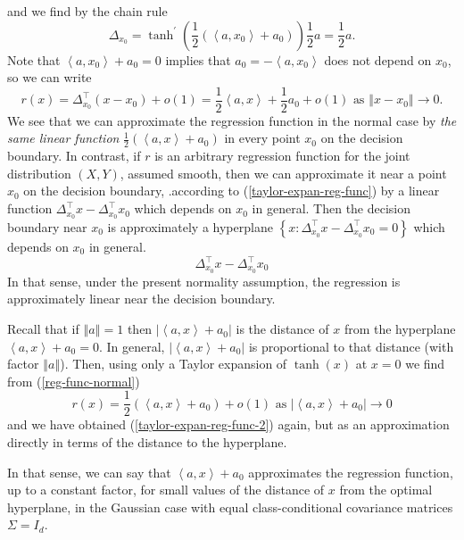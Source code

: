 \documentclass[11pt,twoside]{article}%
\theoremstyle{change}
\begin{document}
and we find by the chain rule
\[
\Delta_{x_{0}}=\tanh^{\prime}(\frac{1}{2}\left(  \left\langle a,x_{0}%
\right\rangle +a_{0}\right)  )\frac{1}{2}a=\frac{1}{2}a.
\]
Note that $\left\langle a,x_{0}\right\rangle +a_{0}=0$ implies that
$a_{0}=-\left\langle a,x_{0}\right\rangle $ does not depend on $x_{0}$, so we
can write
\begin{equation}
r(x)=\Delta_{x_{0}}^{\top}\left(  x-x_{0}\right)  +o(1)=\frac{1}%
{2}\left\langle a,x\right\rangle +\frac{1}{2}a_{0}+o(1)\text{ as }\left\Vert
x-x_{0}\right\Vert \rightarrow0.\label{taylor-expan-reg-func-2}%
\end{equation}
We see that we can approximate the regression function in the normal case by
\textit{the same linear function} $\frac{1}{2}\left(  \left\langle
a,x\right\rangle +a_{0}\right)  $ in every point $x_{0}$ on the decision
boundary. In contrast, if $r$ is an arbitrary regression function for the
joint distribution $(X,Y)$, assumed smooth, then we can approximate it near a
point $x_{0}$ on the decision boundary, .according to
(\ref{taylor-expan-reg-func}) by a linear function $\Delta_{x_{0}}^{\top
}x-\Delta_{x_{0}}^{\top}x_{0}$ which depends on $x_{0}$ in general. Then the
decision boundary near $x_{0}$ is approximately a hyperplane $\left\{
x:\Delta_{x_{0}}^{\top}x-\Delta_{x_{0}}^{\top}x_{0}=0\right\}  $ which depends
on $x_{0}$ in general.
\[
\Delta_{x_{0}}^{\top}x-\Delta_{x_{0}}^{\top}x_{0}%
\]
In that sense, under the present normality assumption, the regression is
approximately linear near the decision boundary.

Recall that if $\left\Vert a\right\Vert =1$ then $\left\vert \left\langle
a,x\right\rangle +a_{0}\right\vert $ is the distance of $x$ from the
hyperplane $\left\langle a,x\right\rangle +a_{0}=0$. In general, $\left\vert
\left\langle a,x\right\rangle +a_{0}\right\vert $ is proportional to that
distance (with factor $\left\Vert a\right\Vert $). Then, using only a Taylor
expansion of $\tanh(x)$ at $x=0$ we find from (\ref{reg-func-normal})%
\[
r(x)=\frac{1}{2}\left(  \left\langle a,x\right\rangle +a_{0}\right)
+o(1)\text{ as }\left\vert \left\langle a,x\right\rangle +a_{0}\right\vert
\rightarrow0
\]
and we have obtained (\ref{taylor-expan-reg-func-2}) again, but as an
approximation directly in terms of the distance to the hyperplane.

In that sense, we can say that $\left\langle a,x\right\rangle +a_{0}$
approximates the regression function, up to a constant factor, for small
values of the distance of $x$ from the optimal hyperplane, in the Gaussian
case with equal class-conditional covariance matrices $\Sigma=I_{d}$.
\end{document}
